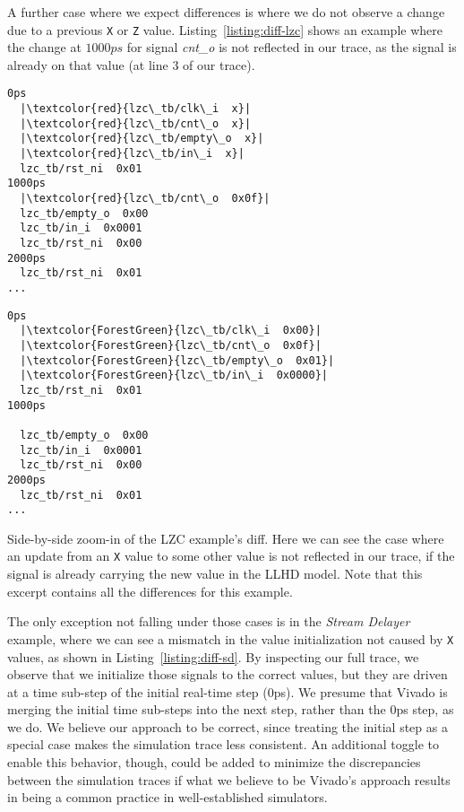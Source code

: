 A further case where we expect differences is where we do not observe a change due to a previous \texttt{X} or \texttt{Z} value. Listing~\ref{listing:diff-lzc} shows an example where the change at $1000ps$ for signal \textit{cnt\_o} is not reflected in our trace, as the signal is already on that value (at line $3$ of our trace).


\begin{listing}
  \lstset{
    escapeinside=||,
    basicstyle=\footnotesize\ttfamily,
    stepnumber=1
  }
  \begin{minipage}{0.45\textwidth}
    \begin{lstlisting}
0ps
  |\textcolor{red}{lzc\_tb/clk\_i  x}|
  |\textcolor{red}{lzc\_tb/cnt\_o  x}|
  |\textcolor{red}{lzc\_tb/empty\_o  x}|
  |\textcolor{red}{lzc\_tb/in\_i  x}|
  lzc_tb/rst_ni  0x01
1000ps
  |\textcolor{red}{lzc\_tb/cnt\_o  0x0f}|
  lzc_tb/empty_o  0x00
  lzc_tb/in_i  0x0001
  lzc_tb/rst_ni  0x00
2000ps
  lzc_tb/rst_ni  0x01
...
        \end{lstlisting}
  \end{minipage}
  \hfill
  \begin{minipage}{0.45\textwidth}
    \begin{lstlisting}
0ps
  |\textcolor{ForestGreen}{lzc\_tb/clk\_i  0x00}|
  |\textcolor{ForestGreen}{lzc\_tb/cnt\_o  0x0f}|
  |\textcolor{ForestGreen}{lzc\_tb/empty\_o  0x01}|
  |\textcolor{ForestGreen}{lzc\_tb/in\_i  0x0000}|
  lzc_tb/rst_ni  0x01
1000ps

  lzc_tb/empty_o  0x00
  lzc_tb/in_i  0x0001
  lzc_tb/rst_ni  0x00
2000ps
  lzc_tb/rst_ni  0x01
...
        \end{lstlisting}
  \end{minipage}
  \caption[Side-by-side zoom-in of the LZC example's diff.]{Side-by-side zoom-in of the LZC example's diff. Here we can see the case where an update from an \texttt{X} value to some other value is not reflected in our trace, if the signal is already carrying the new value in the LLHD model. Note that this excerpt contains all the differences for this example.}
  \label{listing:diff-lzc}
\end{listing}

The only exception not falling under those cases is in the \textit{Stream Delayer} example, where we can see a mismatch in the value initialization not caused by \texttt{X} values, as shown in Listing~\ref{listing:diff-sd}. By inspecting our full trace, we observe that we initialize those signals to the correct values, but they are driven at a time sub-step of the initial real-time step ($0$ps). We presume that Vivado is merging the initial time sub-steps into the next step, rather than the $0$ps step, as we do. We believe our approach to be correct, since treating the initial step as a special case makes the simulation trace less consistent. An additional toggle to enable this behavior, though, could be added to minimize the discrepancies between the simulation traces if what we believe to be Vivado's approach results in being a common practice in well-established simulators.

